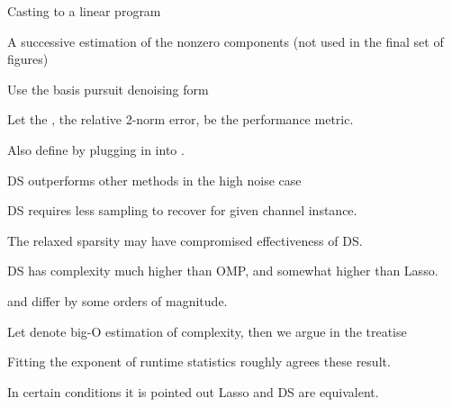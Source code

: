 {
\I Casting to a linear program

\I A successive estimation of the nonzero components (not used in the final set of figures)

\I Use the basis pursuit denoising form
}
{
\I Let the \m {\T {\chi}}, the relative 2-norm error, be the performance metric.


\I Also define \m {\chi} by plugging in  into \m {\T {\chi}}.
}
{
\blank [big]
}
{
\blank [big]
}
{
\blank [big]
}
{
\blank [big]
}
{
\blank [big]
}
{
\blank [big]
}
{
\I DS outperforms other methods in the high noise case

\I DS requires less sampling to recover for given channel instance.

\I The relaxed sparsity may have compromised effectiveness of DS.

\I DS has complexity much higher than OMP, and somewhat higher than Lasso.

\I \m {\T {\chi}} and \m {\chi} differ by some orders of magnitude.
}
{
\I Let  denote big-O estimation of complexity, then we argue in the treatise

\I Fitting the exponent of runtime statistics roughly agrees these result.

\I In certain conditions it is pointed out Lasso and DS are equivalent.
}


